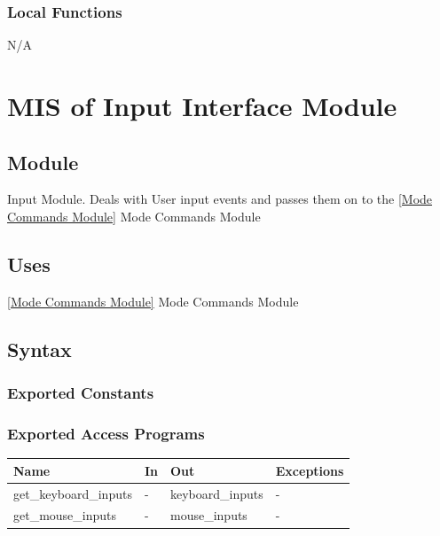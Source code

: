 \documentclass[12pt, titlepage]{article}
\begin{document}

\subsubsection{Local Functions}

N/A

\newpage
\section{MIS of {Input Interface Module}} \label{Input Interface Module}
%
%

\subsection{Module}

Input Module. Deals with User input events and passes them on to the \ref{Mode Commands Module} {Mode Commands Module}

\subsection{Uses}
\ref{Mode Commands Module} {Mode Commands Module}
\subsection{Syntax}

\subsubsection{Exported Constants}



\subsubsection{Exported Access Programs}

\begin{center}
\begin{tabular}{p{4cm} p{4cm} p{4cm} p{2cm}}
\hline
\textbf{Name} & \textbf{In} & \textbf{Out} & \textbf{Exceptions} \\
\hline
 get\_keyboard\_inputs & - & keyboard\_inputs & - \\
\hline
 get\_mouse\_inputs & - & mouse\_inputs & - \\
\hline
\end{tabular}
\end{center}
\end{document}
